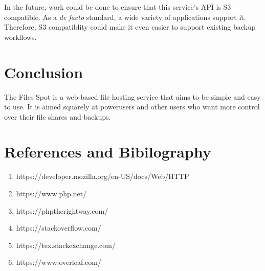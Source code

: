 \documentclass[12pt,a4paper]{report}
\begin{document}
In the future, work could be done to ensure that this service's API is S3 compatible.
As a \textit{de facto} standard, a wide variety of applications support it.
Therefore, S3 compatiblity could make it even easier to support existing backup workflows.
\newpage
\chapter{Conclusion}\label{cha:conclusion}
The Files Spot is a web-based file hosting service that aims to be simple and easy to use.
It is aimed squarely at powerusers and other users who want more control over their file shares and backups.
\newpage
\chapter{References and Bibilography}\label{cha:references_and_bibilography}
\begin{enumerate}
	\item https://developer.mozilla.org/en-US/docs/Web/HTTP
	\item https://www.php.net/
	\item https://phptherightway.com/
	\item https://stackoverflow.com/
	\item https://tex.stackexchange.com/
	\item https://www.overleaf.com/
\end{enumerate}
\end{document}
